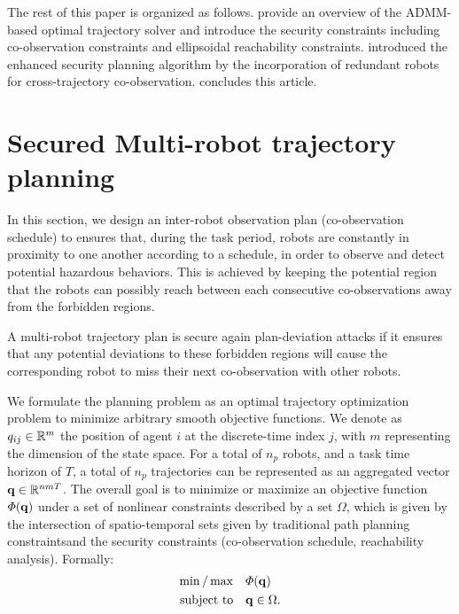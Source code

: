 \documentclass[10pt,twocolumn,twoside]{IEEEtran}
\begin{document}
\noindent{}
The rest of this paper is organized as follows. provide an overview of the ADMM-based optimal trajectory solver and introduce the security constraints including co-observation constraints and ellipsoidal reachability constraints.  introduced the enhanced security planning algorithm by the incorporation of redundant robots for cross-trajectory co-observation.  concludes this article.

\section{Secured Multi-robot trajectory planning}\label{sec:ADMM-planning}

In this section, we design an inter-robot observation plan (co-observation schedule) to ensures that, during the task period, robots are constantly in proximity to one another according to a schedule, in order to observe and detect potential hazardous behaviors. 
This is achieved by keeping the potential region that the robots can possibly reach between each consecutive co-observations away from the forbidden regions. 
\begin{definition}\label{def:secured-plan}
  A multi-robot trajectory plan is secure again plan-deviation attacks if it ensures that any potential deviations to these forbidden regions will cause the corresponding robot to miss their next co-observation with other robots. 
\end{definition}


We formulate the planning problem as an optimal trajectory optimization problem to minimize arbitrary smooth objective functions. We denote as $q_{ij}\in\mathbb{R}^{m}{}$ the position of agent $i$ at the discrete-time index $j$, with $m$ representing the dimension of the state space. For a total of $n_p$ robots, and a task time horizon of $T$, a total of $n_p$ trajectories can be represented as an aggregated vector $\mathbf{q}\in \mathbb{R}^{n m T}{}$. 
The overall goal is to minimize or maximize an objective function $\varPhi(\mathbf{q})$ under a set of nonlinear constraints described by a set $\Omega$, which is given by the intersection of spatio-temporal sets given by traditional path planning constraintsand the security constraints (co-observation schedule, reachability analysis). Formally:
\begin{equation}\label{eq:general-problem}
	\begin{split}
		\min/\max & \quad \varPhi(\mathbf{q})\\
		\textrm{subject to} &\quad \mathbf{q} \in \Omega.
	\end{split}
\end{equation}
\end{document}
